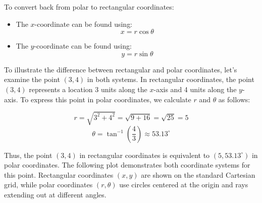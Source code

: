 To convert back from polar to rectangular coordinates:
\begin{itemize}
    \item The \( x \)-coordinate can be found using:
    \[
    x = r \cos \theta
    \]
    \item The \( y \)-coordinate can be found using:
    \[
    y = r \sin \theta
    \]
\end{itemize}

\noindent To illustrate the difference between rectangular and polar coordinates, let’s examine the point \( (3, 4) \) in both systems. In rectangular coordinates, the point \( (3, 4) \) represents a location 3 units along the \( x \)-axis and 4 units along the \( y \)-axis. To express this point in polar coordinates, we calculate \( r \) and \( \theta \) as follows:

\[
r = \sqrt{3^2 + 4^2} = \sqrt{9 + 16} = \sqrt{25} = 5
\]
\[
\theta = \tan^{-1} \left( \frac{4}{3} \right) \approx 53.13^\circ
\]

\noindent Thus, the point \( (3, 4) \) in rectangular coordinates is equivalent to \( (5, 53.13^\circ) \) in polar coordinates. The following plot demonstrates both coordinate systems for this point. Rectangular coordinates \( (x, y) \) are shown on the standard Cartesian grid, while polar coordinates \( (r, \theta) \) use circles centered at the origin and rays extending out at different angles.


